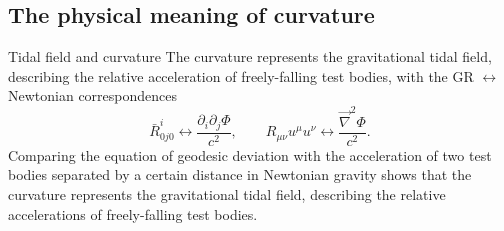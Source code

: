 \subsection{The physical meaning of curvature}
\begin{mybox}{Tidal field and curvature}
	The curvature represents the gravitational tidal field, describing the relative acceleration of freely-falling test bodies, with the GR $\leftrightarrow$ Newtonian correspondences
	\begin{equation}
	\bar{R}^i_{0j0} \leftrightarrow \frac{\partial_i \partial_j \Phi}{c^2}, \qquad R_{\mu \nu} u^{\mu} u^{\nu} \leftrightarrow \frac{\vec{\nabla}^2 \Phi}{c^2}.
	\end{equation}
	Comparing the equation of geodesic deviation with the acceleration of two test bodies separated
	by a certain distance in Newtonian gravity shows that the curvature represents the gravitational
	tidal field, describing the relative accelerations of freely-falling test bodies.
\end{mybox}
